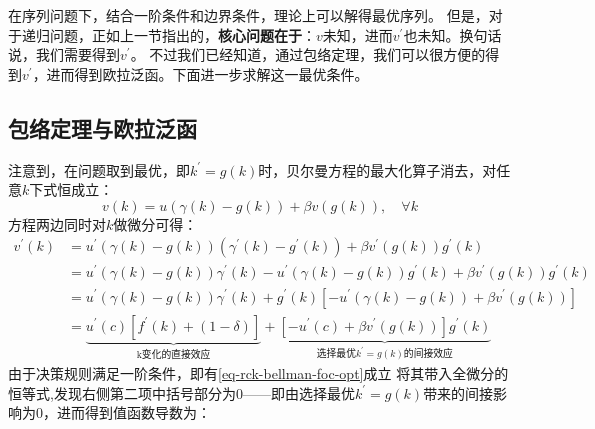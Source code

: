 在序列问题下，结合一阶条件和边界条件，理论上可以解得最优序列。
但是，对于递归问题，正如上一节指出的，\textbf{核心问题在于}：$v$未知，进而$v^{\prime}$也未知。换句话说，我们需要得到$v^{\prime}$。
不过我们已经知道，通过包络定理，我们可以很方便的得到$v^{\prime}$，进而得到欧拉泛函。下面进一步求解这一最优条件。


\subsection{包络定理与欧拉泛函} \label{subsec-rck-euler-fe}

注意到，在问题取到最优，即$k^{\prime}=g\left(k\right)$时，贝尔曼方程的最大化算子消去，对任意$k$下式恒成立：
\begin{equation*}
    v\left(k\right) = 
        u\left(\gamma\left(k\right)-g\left(k\right)\right)+\beta v\left(g\left(k\right)\right),\quad \forall k
\end{equation*}
方程两边同时对$k$做微分可得：
\begin{equation}
    \begin{aligned}
    v^{\prime}\left(k\right) 
    &= u^{\prime}\left(\gamma\left(k\right)-g\left(k\right)\right)
            \left(\gamma^{\prime}\left(k\right)-g^{\prime}\left(k\right)\right)
            + \beta v^{\prime}\left(g\left(k\right)\right)g^{\prime}\left(k\right) \\
    &= u^{\prime}\left(\gamma\left(k\right)-g\left(k\right)\right)\gamma^{\prime}\left(k\right) 
            -u^{\prime}\left(\gamma\left(k\right)-g\left(k\right)\right)g^{\prime}\left(k\right) 
            + \beta v^{\prime}\left(g\left(k\right)\right)g^{\prime}\left(k\right) \\
    & = u^{\prime}\left(\gamma\left(k\right)-g\left(k\right)\right)\gamma^{\prime}\left(k\right)
            +g^{\prime}\left(k\right)\left[-u^{\prime}\left(\gamma\left(k\right)-g\left(k\right)\right)
            +\beta v^{\prime}\left(g\left(k\right)\right)\right] \\
    &= \underbrace{u^{\prime}\left(c\right)\left[f^{\prime}\left(k\right)
            +\left(1-\delta\right)\right]}_{\text{k变化的直接效应}}
            + \underbrace{\left[-u^{\prime}\left(c\right)+\beta v^{\prime}\left(g\left(k\right)\right)\right]
            g^{\prime}\left(k\right)}_{\text{选择最优$k^{\prime}=g\left(k\right)$的间接效应}}
    \end{aligned}
\end{equation}
由于决策规则满足一阶条件，即有\cref{eq-rck-bellman-foc-opt}成立
将其带入全微分的恒等式,发现右侧第二项中括号部分为0——即由选择最优$k^{\prime}=g(k)$带来的间接影响为0，进而得到值函数导数为：
